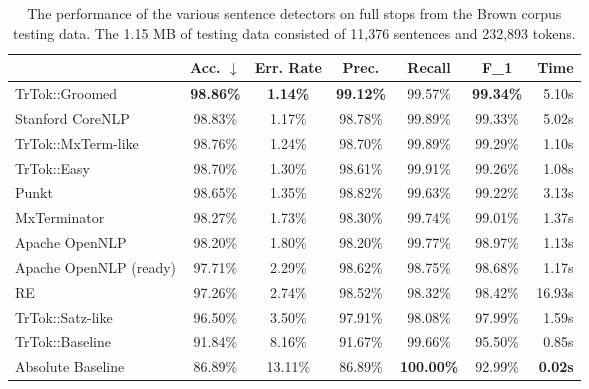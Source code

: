 \begin{table}
  \small
  \begin{center}
    \begin{tabular}{ | l | c | c | c | c | c | r | }
      \hline
      & Acc. $\downarrow$ & Err. Rate & Prec.
      & Recall & F_1 & Time \\ \hline
      TrTok::Groomed & \textbf{98.86\%} & \textbf{1.14\%} & \textbf{99.12\%}
                     & 99.57\% & \textbf{99.34\%} & 5.10s \\ \hline
      Stanford CoreNLP & 98.83\% & 1.17\% & 98.78\%
                       & 99.89\% & 99.33\% & 5.02s \\ \hline
      TrTok::MxTerm-like & 98.76\% & 1.24\% & 98.70\%
                         & 99.89\% & 99.29\% & 1.10s \\ \hline
      TrTok::Easy & 98.70\% & 1.30\% & 98.61\%
                  & 99.91\% & 99.26\% & 1.08s \\ \hline
      Punkt & 98.65\% & 1.35\% & 98.82\%
            & 99.63\% & 99.22\% & 3.13s \\ \hline
      MxTerminator & 98.27\% & 1.73\% & 98.30\%
                   & 99.74\% & 99.01\% & 1.37s \\ \hline
      Apache OpenNLP & 98.20\% & 1.80\% & 98.20\%
                     & 99.77\% & 98.97\% & 1.13s \\ \hline
      Apache OpenNLP (ready) & 97.71\% & 2.29\% & 98.62\%
                             & 98.75\% & 98.68\% & 1.17s \\ \hline
      RE & 97.26\% & 2.74\% & 98.52\%
         & 98.32\% & 98.42\% & 16.93s \\ \hline
      TrTok::Satz-like & 96.50\% & 3.50\% & 97.91\%
                       & 98.08\% & 97.99\% & 1.59s \\ \hline
      TrTok::Baseline & 91.84\% & 8.16\% & 91.67\%
                      & 99.66\% & 95.50\% & 0.85s \\ \hline
      Absolute Baseline & 86.89\% & 13.11\% & 86.89\%
                        & \textbf{100.00\%} & 92.99\% & \textbf{0.02s} \\ \hline
    \end{tabular}
  \end{center}
  \caption[Performance of sentence detectors on the Brown corpus] {The
    performance of the various sentence detectors on full stops from
    the Brown corpus testing data. The 1.15 MB of testing data
    consisted of 11,376 sentences and 232,893 tokens.}
  \label{tbl:grand-melee}
\end{table}

